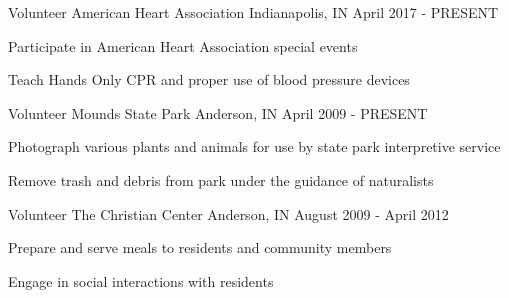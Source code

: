 

\begin{cventries}

  \cventry
    {Volunteer} %
    {American Heart Association} %
    {Indianapolis, IN} %
    {April 2017 - PRESENT} %
    {
      \begin{cvitems} %
        \item {Participate in American Heart Association special events}
        \item {Teach Hands Only CPR and proper use of blood pressure devices}
      \end{cvitems}
    }

  \cventry
    {Volunteer} %
    {Mounds State Park} %
    {Anderson, IN} %
    {April 2009 - PRESENT} %
    {
      \begin{cvitems} %
        \item {Photograph various plants and animals for use by state park interpretive service}
        \item {Remove trash and debris from park under the guidance of naturalists}
      \end{cvitems}
    }

  \cventry
    {Volunteer}
    {The Christian Center}
    {Anderson, IN}
    {August 2009 - April 2012}
    {
      \begin{cvitems}
        \item {Prepare and serve meals to residents and community members}
        \item {Engage in social interactions with residents}
      \end{cvitems}
    }
    

\end{cventries}
